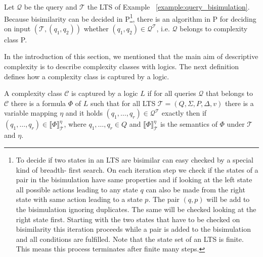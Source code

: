 \begin{example}{\cite{lange2014capturing}}
    Let $\mathcal{Q}$ be the query and $\mathcal{T}$ the LTS of Example~
    \ref{example:query_bisimulation}. Because bisimilarity can be decided in P\footnote{To 
    decide if two states in an LTS are bisimilar can easy checked by a special kind of breadth-
    first search. On each iteration step we check if the states of a pair in the bisimulation have 
    same properties and if looking at the left state all possible actions leading to any state $q
    $ can also be made from the right state with same action leading to a state $p$. The pair $
    (q, p)$ will be add to the bisimulation ignoring duplicates. The same will be checked looking 
    at the right state first. Starting with the two states that have to be checked on bisimilarity this 
    iteration proceeds while a pair is added to the bisimulation and all conditions are fulfilled. Note that the state set of an LTS is finite. This means this process terminates after finite many steps.}, 
    there is an 
    algorithm in P for deciding on input $(\mathcal{T}, (q_1, q_2))$ whether $(q_1, q_2) \in 
    \mathcal{Q}^\mathcal{T}$, i.e. $\mathcal{Q}$ belongs to 
    complexity class P.
\end{example}

In the introduction of this section, we mentioned that the main aim of descriptive complexity is to describe complexity classes with logics. The next definition defines how a complexity class is captured by a logic. 

\begin{definition}
A complexity class $\mathcal{C}$ is captured by a logic $L$ if for all queries $\mathcal{Q}$ that belongs to $\mathcal{C}$ there is a formula $\Phi$ of $L$ such that for all LTS $\mathcal{T} = (Q, \Sigma, P, \Delta, v)$ there is a variable mapping $\eta$ and it holds $(q_1, \dots, q_{r}) \in \mathcal{Q}^\mathcal{T}$ exactly then if $(q_1, \dots, q_{r}) \in \llbracket \Phi \rrbracket^\eta_\mathcal{T}$, where $q_1, \dots, q_r \in Q$ and $\llbracket \Phi \rrbracket^\eta_\mathcal{T}$ is the semantics of $\Phi$ under $\mathcal{T}$ and $\eta$.
\end{definition}

